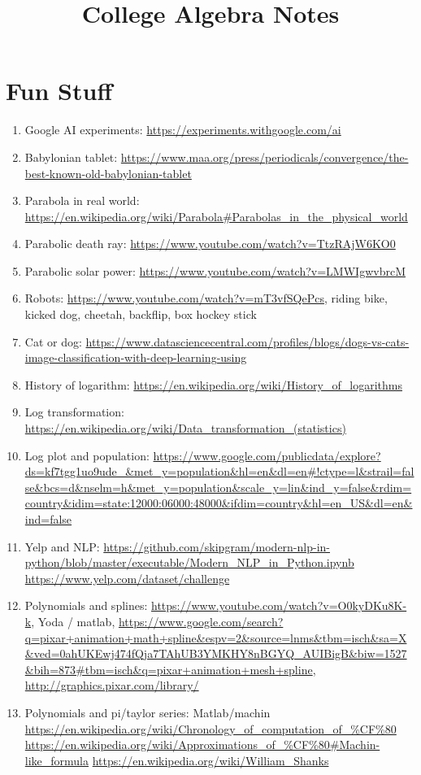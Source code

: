 \documentclass{article}
\title{College Algebra Notes}
\date
\begin{document}
\maketitle
\large

\tableofcontents

\section{Fun Stuff}

\begin{enumerate}
\item Google AI experiments: \url{https://experiments.withgoogle.com/ai}
\item Babylonian tablet: \url{https://www.maa.org/press/periodicals/convergence/the-best-known-old-babylonian-tablet}
\item Parabola in real world: \url{https://en.wikipedia.org/wiki/Parabola#Parabolas_in_the_physical_world}
\item Parabolic death ray: \url{https://www.youtube.com/watch?v=TtzRAjW6KO0}
\item Parabolic solar power: \url{https://www.youtube.com/watch?v=LMWIgwvbrcM}
\item Robots: \url{https://www.youtube.com/watch?v=mT3vfSQePcs}, riding bike, kicked dog, cheetah, backflip, box hockey stick
\item Cat or dog: \url{https://www.datasciencecentral.com/profiles/blogs/dogs-vs-cats-image-classification-with-deep-learning-using}
\item History of logarithm: \url{https://en.wikipedia.org/wiki/History_of_logarithms}
\item Log transformation: \url{https://en.wikipedia.org/wiki/Data_transformation_(statistics)}
\item Log plot and population: \url{https://www.google.com/publicdata/explore?ds=kf7tgg1uo9ude_&met_y=population&hl=en&dl=en#!ctype=l&strail=false&bcs=d&nselm=h&met_y=population&scale_y=lin&ind_y=false&rdim=country&idim=state:12000:06000:48000&ifdim=country&hl=en_US&dl=en&ind=false} 
\item Yelp and NLP: \url{https://github.com/skipgram/modern-nlp-in-python/blob/master/executable/Modern_NLP_in_Python.ipynb} \url{https://www.yelp.com/dataset/challenge}
\item Polynomials and splines: \url{https://www.youtube.com/watch?v=O0kyDKu8K-k}, Yoda / matlab, \url{https://www.google.com/search?q=pixar+animation+math+spline&espv=2&source=lnms&tbm=isch&sa=X&ved=0ahUKEwj474fQja7TAhUB3YMKHY8nBGYQ_AUIBigB&biw=1527&bih=873#tbm=isch&q=pixar+animation+mesh+spline}, \url{http://graphics.pixar.com/library/}
\item Polynomials and pi/taylor series: Matlab/machin \url{https://en.wikipedia.org/wiki/Chronology_of_computation_of_%CF%80} 
\url{https://en.wikipedia.org/wiki/Approximations_of_%CF%80#Machin-like_formula}
\url{https://en.wikipedia.org/wiki/William_Shanks}
\end{enumerate}
\end{document}
